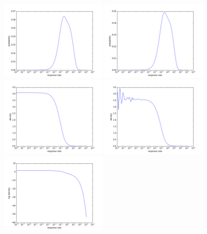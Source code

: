 \documentclass{scrartcl}
\begin{document}
\begin{figure}[h]
\centering
\includegraphics[width=0.47\textwidth, clip]{../pics/s2/margXProb_analytic_final}
\includegraphics[width=0.47\textwidth, clip]{../pics/s2/margXProb_numeric_final} \\
\includegraphics[width=0.47\textwidth, clip]{../pics/s2/margXDens_analytic_final}
\includegraphics[width=0.47\textwidth, clip]{../pics/s2/margXDens_numeric_final}\\
\includegraphics[width=0.47\textwidth, clip]{../pics/s2/margXLogDens_analytic_final}

\end{figure}
\end{document}
